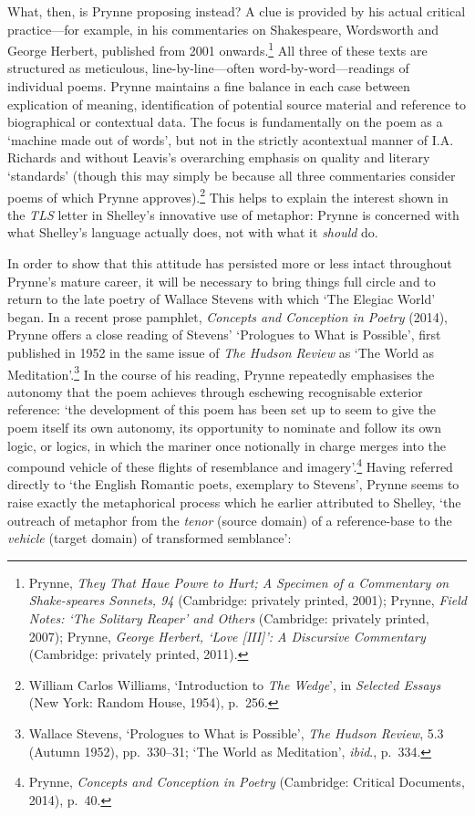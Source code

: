 \documentclass[]{article}
\begin{document}
What, then, is Prynne proposing instead? A clue is provided by his
actual critical practice---for example, in his commentaries on
Shakespeare, Wordsworth and George Herbert, published from 2001
onwards.\footnote{Prynne, \emph{They That Haue Powre to Hurt; A Specimen
  of a Commentary on Shake-speares Sonnets, 94} (Cambridge: privately
  printed, 2001); Prynne, \emph{Field Notes: `The Solitary Reaper' and
  Others} (Cambridge: privately printed, 2007); Prynne, \emph{George
  Herbert, `Love {[}III{]}': A Discursive Commentary} (Cambridge:
  privately printed, 2011).} All three of these texts are structured as
meticulous, line-by-line---often word-by-word---readings of individual
poems. Prynne maintains a fine balance in each case between explication
of meaning, identification of potential source material and reference to
biographical or contextual data. The focus is fundamentally on the poem
as a `machine made out of words', but not in the strictly acontextual
manner of I.A. Richards and without Leavis's overarching emphasis on
quality and literary `standards' (though this may simply be because all
three commentaries consider poems of which Prynne approves).\footnote{William
  Carlos Williams, `Introduction to \emph{The Wedge}', in \emph{Selected
  Essays} (New York: Random House, 1954), p.~256.} This helps to explain
the interest shown in the \emph{TLS} letter in Shelley's innovative use
of metaphor: Prynne is concerned with what Shelley's language actually
does, not with what it \emph{should} do.

In order to show that this attitude has persisted more or less intact
throughout Prynne's mature career, it will be necessary to bring things
full circle and to return to the late poetry of Wallace Stevens with
which `The Elegiac World' began. In a recent prose pamphlet,
\emph{Concepts and Conception in Poetry} (2014), Prynne offers a close
reading of Stevens' `Prologues to What is Possible', first published in
1952 in the same issue of \emph{The Hudson Review} as `The World as
Meditation'.\footnote{Wallace Stevens, `Prologues to What is Possible',
  \emph{The Hudson Review}, 5.3 (Autumn 1952), pp.~330--31; `The World
  as Meditation', \emph{ibid}., p.~334.} In the course of his reading,
Prynne repeatedly emphasises the autonomy that the poem achieves through
eschewing recognisable exterior reference: `the development of this poem
has been set up to seem to give the poem itself its own autonomy, its
opportunity to nominate and follow its own logic, or logics, in which
the mariner once notionally in charge merges into the compound vehicle
of these flights of resemblance and imagery'.\footnote{Prynne,
  \emph{Concepts and Conception in Poetry} (Cambridge: Critical
  Documents, 2014), p.~40.} Having referred directly to `the English
Romantic poets, exemplary to Stevens', Prynne seems to raise exactly the
metaphorical process which he earlier attributed to Shelley, `the
outreach of metaphor from the \emph{tenor} (source domain) of a
reference-base to the \emph{vehicle} (target domain) of transformed
semblance':
\end{document}

